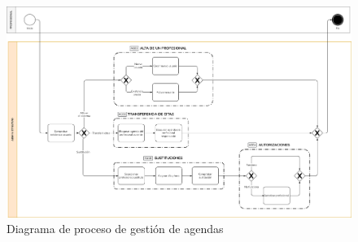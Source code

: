 \documentclass[12pt, a4paper, twoside, openright]{report}
\begin{document}
\begin{figure}
    \centering
    \begin{sideways}
        \includegraphics[width=0.95\textheight]{img/proceso-agendas.png}
    \end{sideways}
    \caption{Diagrama de proceso de gestión de agendas}
    \label{fig:proceso-agendas}
\end{figure}

\printnoidxglossaries

\listoffigures
\listoftables

\printbibliography
\end{document}
